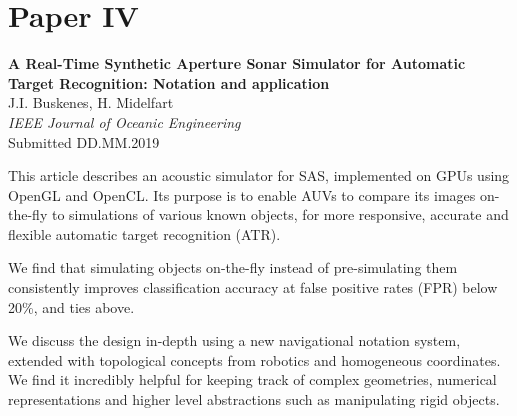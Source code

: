 \section{Paper IV}\label{sec:paperIV} %
\textbf{A Real-Time Synthetic Aperture Sonar Simulator for Automatic Target Recognition: Notation and application}\\
J.I. Buskenes, H. Midelfart\\
\textit{IEEE Journal of Oceanic Engineering}\\
Submitted DD.MM.2019%

This article describes an acoustic simulator for SAS, implemented on GPUs using OpenGL and OpenCL. Its purpose is to enable AUVs to compare its images on-the-fly to simulations of various known objects, for more responsive, accurate and flexible automatic target recognition (ATR).

We find that simulating objects on-the-fly instead of pre-simulating them consistently improves classification accuracy at false positive rates (FPR) below 20\%, and ties above. 

We discuss the design in-depth using a new navigational notation system, extended with topological concepts from robotics and homogeneous coordinates. We find it incredibly helpful for keeping track of complex geometries, numerical representations and higher level abstractions such as manipulating rigid objects. 




%
%
%





